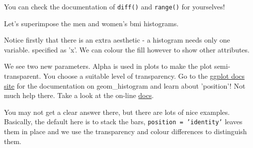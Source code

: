 \documentclass[titlepage]{book}\usepackage{knitr}
\begin{document}
\begin{knitrout}
\color{fgcolor}\begin{kframe}
\begin{alltt}
 \hlkwb{<-} \hlstd{(}\hlopt{$}\hlopt{/}
 \hlkwb{<-} \hlstd{(}  \hlstd{(} 
 \hlkwb{<-}  \hlopt{+} \hlstd{(}   \hlstd{=} \hlstd{,}  \hlstd{=} \hlstd{)}
\end{alltt}
\end{kframe}
\end{knitrout}
You can check the documentation of \texttt{diff()} and \texttt{range()} for yourselves!

Let's superimpose the men and women's bmi histograms.
\begin{knitrout}
\color{fgcolor}\begin{kframe}
\begin{alltt}
 \hlkwb{<-} \hlstd{(}  \hlstd{(}   
 \hlkwb{<-}  \hlopt{+} \hlstd{(} 
                         \hlstd{=} \hlstd{,}
                           \hlstd{=} \hlstd{,}
                            \hlstd{=} \hlstd{)}
\end{alltt}
\end{kframe}
\end{knitrout}
Notice firstly that there is an extra aesthetic - a histogram needs only one variable. specified as 'x'. We can colour the fill however to show other attributes. 

We see two new parameters. Alpha is used in plots to make the plot semi-transparent. You choose a suitable level of transparency.  Go to the \href{http://docs.ggplot2.org/}{ggplot docs site} for the documentation on geom\_histogram and learn about 'position'!  Not much help there.  Take a look at the on-line \href{https://ggplot2.tidyverse.org/reference/#section-layer-position-adjustment}{docs}.

You may not get a clear answer there, but there are lots of nice examples. Basically, the default here is to stack the bars, \texttt{position = 'identity'} leaves them in place and we use the transparency and colour differences to distinguish them.
\end{document}
